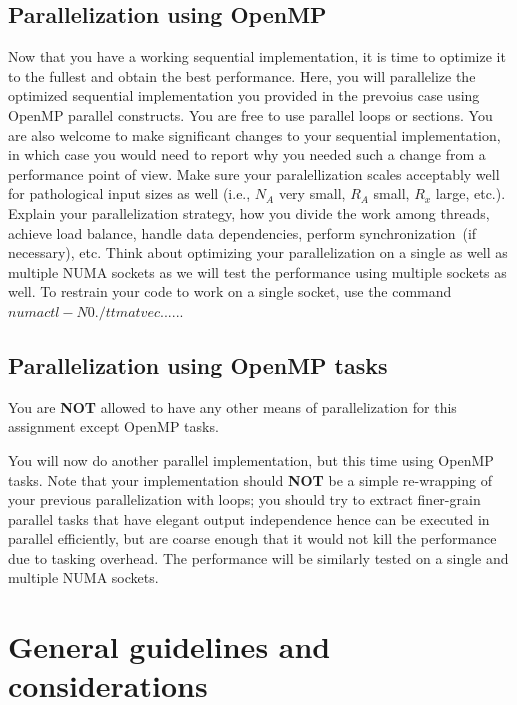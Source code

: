 \documentclass{article}
\begin{document}
\subsection{Parallelization using OpenMP}
Now that you have a working sequential implementation, it is time to optimize it to the fullest and obtain the best performance.
Here, you will parallelize the optimized sequential implementation you provided in the prevoius case using OpenMP parallel constructs.
You are free to use parallel loops or sections.
You are also welcome to make significant changes to your sequential implementation, in which case you would need to report why you needed such a change from a performance point of view.
Make sure your paralellization scales acceptably well for pathological input sizes as well (i.e., $N_A$ very small, $R_A$ small, $R_x$ large, etc.).
Explain your parallelization strategy, how you divide the work among threads, achieve load balance, handle data dependencies, perform synchronization~(if necessary), etc.
Think about optimizing your parallelization on a single as well as multiple NUMA sockets as we will test the performance using multiple sockets as well.
To restrain your code to work on a single socket, use the command $numactl -N 0 ./ttmatvec .....$.

\subsection{Parallelization using OpenMP tasks}
You are \textbf{NOT} allowed to have any other means of parallelization for this assignment except OpenMP tasks.

You will now do another parallel implementation, but this time using OpenMP tasks.
Note that your implementation should \textbf{NOT} be a simple re-wrapping of your previous parallelization with loops; you should try to extract finer-grain parallel tasks that have elegant output independence hence can be executed in parallel efficiently, but are coarse enough that it would not kill the performance due to tasking overhead.
The performance will be similarly tested on a single and multiple NUMA sockets.

\section{General guidelines and considerations}
\end{document}
